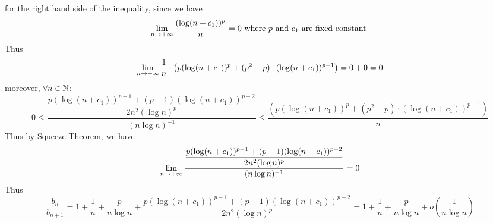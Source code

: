 \documentclass{article}
\begin{document}
for the right hand side of the inequality, since we have
$$\lim\limits_{n\rightarrow +\infty} \frac{(\log (n+c_1))^p}{n}=0 \text{ where $p$ and $c_1$ are fixed constant }$$
Thus
$$\lim\limits_{n\rightarrow +\infty}  \frac{1 }{n} \cdot \left(p(\log (n+c_1))^p +(p^2-p)\cdot (\log (n+c_1))^{p-1} \right)=0+0=0$$
moreover, $\forall n \in \mathbb{N}$:
$$0\le \frac{\dfrac{p(\log (n+c_1))^{p-1} + (p-1)(\log (n+c_1))^{p-2}}{ 2n^2 (\log n)^p}}{(n\log n)^{-1}} \le \frac{ \left(p(\log (n+c_1))^p +(p^2-p)\cdot (\log (n+c_1))^{p-1} \right) }{n}$$
Thus by Squeeze Theorem, we have
$$\lim\limits_{n\rightarrow +\infty}\frac{\dfrac{p(\log (n+c_1))^{p-1} + (p-1)(\log (n+c_1))^{p-2}}{ 2n^2 (\log n)^p}}{(n\log n)^{-1}}=0$$
Thus
$$\frac{b_n}{b_{n+1}}= 1+\frac{1}{n} +\frac{p}{n \log n} + \frac{p(\log (n+c_1))^{p-1} + (p-1)(\log (n+c_1))^{p-2}}{ 2n^2 (\log n)^p}=1+\frac{1}{n}+\frac{p}{n\log n}+o\left(\frac{1}{n\log n}\right)$$
\end{document}
